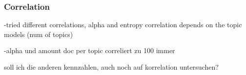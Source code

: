 \subsubsection{Correlation}

-tried different correlations, 
alpha and entropy correlation depends on the topic models (num of topics)

-alpha und amount doc per topic correliert zu 100 immer

soll ich die anderen kennzahlen, auch noch auf korrelation untersuchen? 









